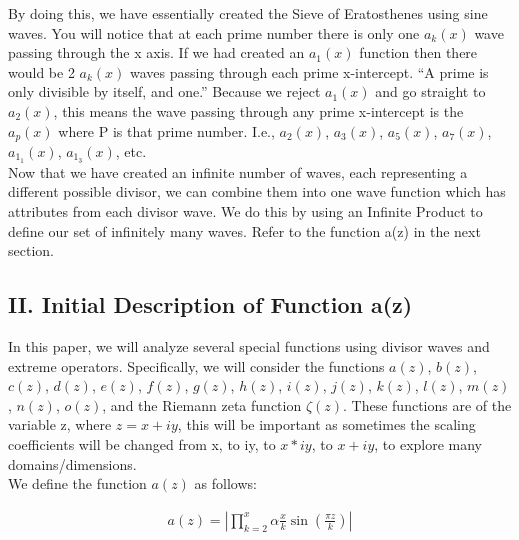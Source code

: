 \documentclass{article}
\begin{document}
By doing this, we have essentially created the Sieve of Eratosthenes using sine waves. You will notice that at each prime number there is only one $a_k(x)$ wave passing through the x axis. If we had created an $a_1(x)$ function then there would be 2 $a_k(x)$ waves passing through each prime x-intercept. “A prime is only divisible by itself, and one.” Because we reject $a_1(x)$ and go straight to $a_2(x)$, this means the wave passing through any prime x-intercept is the $a_p(x)$ where P is that prime number. I.e., $a_2(x)$, $a_3(x)$, $a_5(x)$, $a_7(x)$, $a_1_1(x)$, $a_1_3(x)$, etc. \\
\newline
Now that we have created an infinite number of waves, each representing a different possible divisor, we can combine them into one wave function which has attributes from each divisor wave. We do this by using an Infinite Product to define our set of infinitely many waves. Refer to the function a(z) in the next section.

\subsection*{II. Initial Description of Function a(z)}
In this paper, we will analyze several special functions using divisor waves and extreme operators. Specifically, we will consider the functions $a(z)$, $b(z)$, $c(z)$, $d(z)$, $e(z)$, $f(z)$, $g(z)$, $h(z)$, $i(z)$, $j(z)$, $k(z)$, $l(z)$, $m(z)$, $n(z)$, $o(z)$, and the Riemann zeta function $\zeta(z)$. These functions are of the variable z, where $z = x + iy$, this will be important as sometimes the scaling coefficients will be changed from x, to iy, to $x*iy$, to $x + iy$, to explore many domains/dimensions. \\

We define the function $a(z)$ as follows:

\begin{align*}
	a(z) = |\prod_{k=2}^x \alpha\frac{x}{k}\sin\left(\frac{\pi z}{k}\right)|
\end{align*}
	
\end{document}
